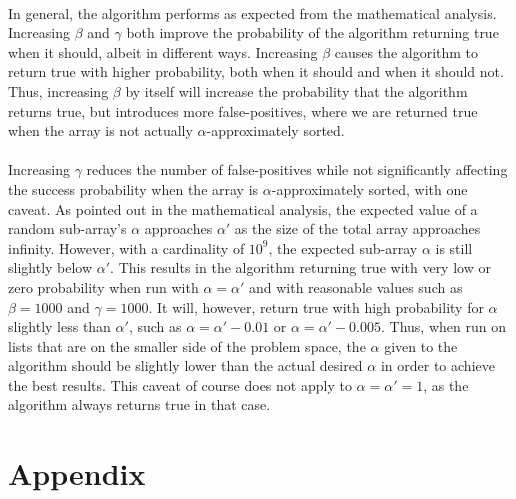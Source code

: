 \documentclass{article}
\begin{document}
\paragraph{}In general, the algorithm performs as expected from the mathematical analysis. 
Increasing $\beta$ and $\gamma$ both improve the probability of the algorithm returning true when it should, albeit in different ways.
Increasing $\beta$ causes the algorithm to return true with higher probability, both when it should and when it should not.
Thus, increasing $\beta$ by itself will increase the probability that the algorithm returns true, but introduces more false-positives, where we are returned true when the array is not actually $\alpha$-approximately sorted.
\paragraph{}Increasing $\gamma$ reduces the number of false-positives while not significantly affecting the success probability when the array is $\alpha$-approximately sorted, with one caveat.
As pointed out in the mathematical analysis, the expected value of a random sub-array's $\alpha$ approaches $\alpha'$ as the size of the total array approaches infinity.
However, with a cardinality of $10^9$, the expected sub-array $\alpha$ is still slightly below $\alpha'$. 
This results in the algorithm returning true with very low or zero probability when run with $\alpha = \alpha'$ and with reasonable values such as $\beta = 1000$ and $\gamma = 1000$.
It will, however, return true with high probability for $\alpha$ slightly less than $\alpha'$, such as $\alpha = \alpha' - 0.01$ or $\alpha = \alpha' - 0.005$.
Thus, when run on lists that are on the smaller side of the problem space, the $\alpha$ given to the algorithm should be slightly lower than the actual desired $\alpha$ in order to achieve the best results.
This caveat of course does not apply to $\alpha = \alpha' = 1$, as the algorithm always returns true in that case.
\section{Appendix}
\end{document}
